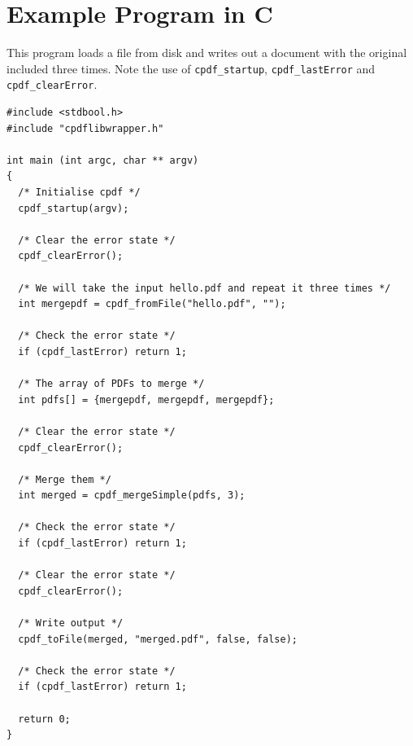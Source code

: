 \documentclass[a4paper]{memoir}
\begin{document}
\chapter{Example Program in C}
This program loads a file from disk and writes out a document with the original included three times. Note the use of \texttt{cpdf\_startup}, \texttt{cpdf\_lastError} and \texttt{cpdf\_clearError}.

\begin{small}
\begin{verbatim}
#include <stdbool.h>
#include "cpdflibwrapper.h"

int main (int argc, char ** argv)
{
  /* Initialise cpdf */
  cpdf_startup(argv);

  /* Clear the error state */
  cpdf_clearError();

  /* We will take the input hello.pdf and repeat it three times */
  int mergepdf = cpdf_fromFile("hello.pdf", "");

  /* Check the error state */
  if (cpdf_lastError) return 1;

  /* The array of PDFs to merge */
  int pdfs[] = {mergepdf, mergepdf, mergepdf};

  /* Clear the error state */
  cpdf_clearError();

  /* Merge them */
  int merged = cpdf_mergeSimple(pdfs, 3);
  
  /* Check the error state */
  if (cpdf_lastError) return 1;

  /* Clear the error state */
  cpdf_clearError();

  /* Write output */
  cpdf_toFile(merged, "merged.pdf", false, false);

  /* Check the error state */
  if (cpdf_lastError) return 1;

  return 0;
}
\end{verbatim}
\end{small}

\backmatter
\end{document}
